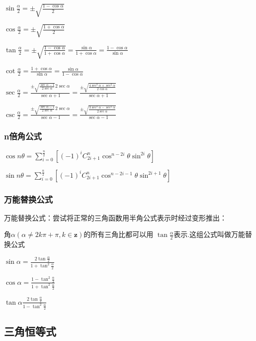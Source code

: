 \documentclass[UTF8]{ctexbook}
\newcommand{\mathCombination}[2]{C_{#1}^{#2}}
\begin{document}
{{{{  $\sin\frac{\alpha}{2} = \pm\sqrt{\frac{1 - \cos\alpha}{2}}$

  $\cos\frac{\alpha}{2} = \pm\sqrt{\frac{1 + \cos\alpha}{2}}$

  $\tan\frac{\alpha}{2} = \pm\sqrt{\frac{1-\cos\alpha}{1+\cos\alpha}} = \frac{\sin\alpha}{1+\cos\alpha} = \frac{1-\cos\alpha}{\sin\alpha}$

  $\cot\frac{\alpha}{2} = \frac{1+\cos\alpha}{\sin\alpha} = \frac{\sin\alpha}{1-\cos\alpha}$

  $\sec\frac{\alpha}{2} = \frac{\pm\sqrt{\frac{\sec\alpha - 1}{2\sec\alpha}}2\sec\alpha}{\sec\alpha + 1} = \frac{\pm\sqrt{\frac{4\sec^3\alpha + \sec^2\alpha}{2\cos\alpha}}}{\sec\alpha + 1}$

  $\csc\frac{\alpha}{2} = \frac{\pm\sqrt{\frac{\sec\alpha - 1}{2\sec\alpha}}2\sec\alpha}{\sec\alpha - 1} = \frac{\pm\sqrt{\frac{3\sec^3\alpha - \sec^2\alpha}{2\sec\alpha}}}{\sec\alpha - 1}$
}%

\subsubsection{n倍角公式}{
$\cos{n\theta} = \sum_{i = 0}^{\frac{n}{2}}[(-1)^i\mathCombination{2i + 1}{n}\cos^{n - 2i}\theta\sin^{2i}\theta]$

$\sin{n\theta} = \sum_{i = 0}^{\frac{n}{2}}[(-1)^i\mathCombination{2i + 1}{n}\cos^{n - 2i - 1}\theta\sin^{2i+1}\theta]$
}%

\subsubsection{万能替换公式}{
  万能替换公式：尝试将正常的三角函数用半角公式表示时经过变形推出：

  角$\alpha(\alpha \neq 2k\pi + \pi ,k \in \mathbf{z})$的所有三角比都可以用 $\tan\frac{\alpha}{2}$表示.这组公式叫做万能替换公式

  $\sin\alpha = \frac{2\tan\frac{\alpha}{2}}{1+\tan^2\frac{\alpha}{2}}$

  $\cos\alpha = \frac{1 - \tan^2\frac{\alpha}{2}}{1 + \tan^2\frac{\alpha}{2}}$

  $\tan\alpha \frac{2\tan\frac{\alpha}{2}}{1 - \tan^2\frac{\alpha}{2}}$
}%

}%

\subsection{三角恒等式}{

}}}
\end{document}
